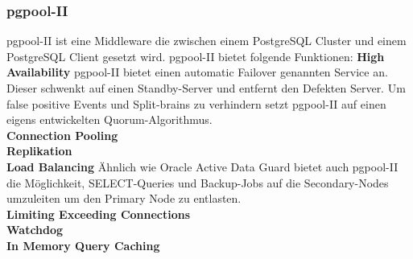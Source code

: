 
\subsubsection{pgpool-II}
pgpool-II ist eine Middleware die zwischen einem \Gls{PostgreSQL Cluster} und einem PostgreSQL Client gesetzt wird.
pgpool-II bietet folgende Funktionen\cite{EXVNLICT,3XWCD3KX}:
\textbf{High Availability}
pgpool-II bietet einen automatic \Gls{Failover} genannten Service an.
Dieser schwenkt auf einen Standby-Server und entfernt den Defekten Server.
Um false positive Events und Split-brains zu verhindern setzt pgpool-II auf einen eigens entwickelten \Gls{Quorum}-Algorithmus.
\\\textbf{Connection Pooling}
\\\textbf{Replikation}
\\\textbf{Load Balancing}
Ähnlich wie Oracle Active Data Guard \cite{6294443C} bietet auch pgpool-II die Möglichkeit, SELECT-Queries und Backup-Jobs auf die Secondary-Nodes umzuleiten um den Primary Node zu entlasten.
\\\textbf{Limiting Exceeding Connections}
\\\textbf{Watchdog}
\\\textbf{In Memory Query Caching}
